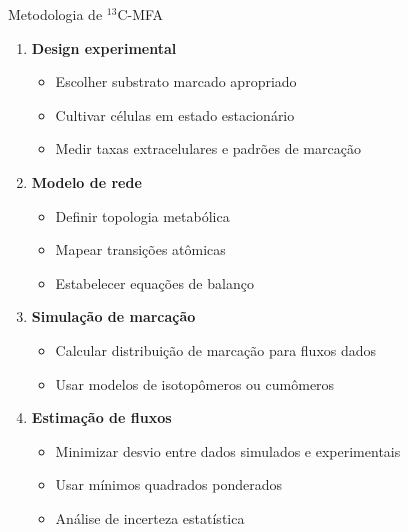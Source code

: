 \begin{frame}{Metodologia de $^{13}$C-MFA}
\begin{enumerate}
    \item \textbf{Design experimental}
    \begin{itemize}
        \item Escolher substrato marcado apropriado
        \item Cultivar células em estado estacionário
        \item Medir taxas extracelulares e padrões de marcação
    \end{itemize}

    \item \textbf{Modelo de rede}
    \begin{itemize}
        \item Definir topologia metabólica
        \item Mapear transições atômicas
        \item Estabelecer equações de balanço
    \end{itemize}

    \item \textbf{Simulação de marcação}
    \begin{itemize}
        \item Calcular distribuição de marcação para fluxos dados
        \item Usar modelos de isotopômeros ou cumômeros
    \end{itemize}

    \item \textbf{Estimação de fluxos}
    \begin{itemize}
        \item Minimizar desvio entre dados simulados e experimentais
        \item Usar mínimos quadrados ponderados
        \item Análise de incerteza estatística
    \end{itemize}
\end{enumerate}
\end{frame}

